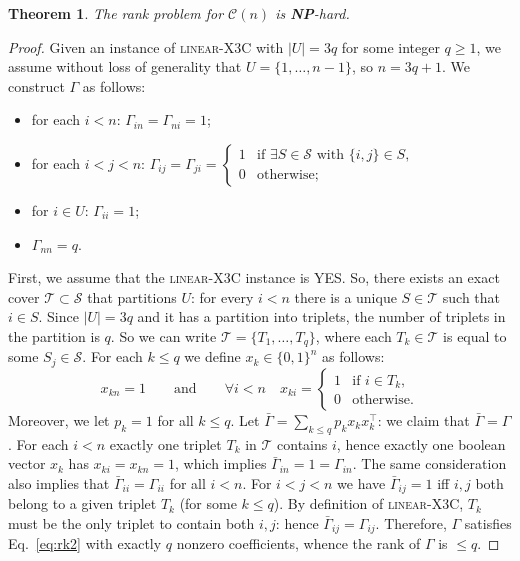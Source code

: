 \documentclass[10pt,a4paper]{amsart}
\newtheorem{theorem}{Theorem}
\newcommand{\CONX}[1]{\mathcal{C}(#1)}
\newcommand{\transpose}[1]{{#1}^{\top}}
\begin{document}
\begin{theorem}
  The rank problem for $\CONX{n}$ is \textbf{NP}-hard.
  \label{thm:rkhard}
\end{theorem}

\begin{proof}
  Given an instance of \textsc{linear}-X3C with $|U|=3q$ for some integer $q\ge 1$, we assume without loss of generality that $U=\{1,\ldots,n-1\}$, so $n=3q+1$. We construct $\Gamma$ as follows:
  \begin{itemize}
  \item for each $i<n$: $\Gamma_{in}=\Gamma_{ni} = 1$;
  \item for each $i<j<n$:
    $\Gamma_{ij} = \Gamma_{ji} = \left\{\begin{array}{ll} 1 & \mbox{if $\exists S\in\mathcal{S}$ with $\{i,j\}\in S$,} \\
      0 & \mbox{otherwise;}
    \end{array}\right.
    $
  \item for $i\in U$: $\Gamma_{ii} = 1$;
  \item $\Gamma_{nn}=q$.
  \end{itemize}
  
  First, we assume that the \textsc{linear}-X3C instance is YES. So, there exists an exact cover $\mathcal{T}\subset\mathcal{S}$ that partitions $U$: for every $i<n$ there is a unique $S\in\mathcal{T}$ such that $i\in S$. Since $|U|=3q$ and it has a partition into triplets, the number of triplets in the partition is $q$. So we can write $\mathcal{T}=\{T_1,\ldots,T_q\}$, where each $T_k\in\mathcal{T}$ is equal to some $S_j\in\mathcal{S}$. For each $k\le q$ we define $x_k\in\{0,1\}^n$ as follows:
  \[
  x_{kn}=1 \qquad \mbox{and} \qquad \forall i<n\quad x_{ki}=\left\{\begin{array}{ll} 1 & \mbox{if $i\in T_k$,} \\ 0 & \mbox{otherwise.}\end{array}\right.
  \]
  Moreover, we let $p_k=1$ for all $k\le q$. Let $\bar{\Gamma}=\sum_{k\le q} p_k x_k\transpose{x}_k$: we claim that $\bar{\Gamma}=\Gamma$. For each $i<n$ exactly one triplet $T_k$ in $\mathcal{T}$ contains $i$, hence exactly one boolean vector $x_k$ has $x_{ki}=x_{kn}=1$, which implies $\bar{\Gamma}_{in}=1=\Gamma_{in}$. The same consideration also implies that $\bar{\Gamma}_{ii}=\Gamma_{ii}$ for all $i<n$. For $i<j<n$ we have $\bar{\Gamma}_{ij}=1$ iff $i,j$ both belong to a given triplet $T_k$ (for some $k\le q$). By definition of \textsc{linear}-X3C, $T_k$ must be the only triplet to contain both $i,j$: hence $\bar{\Gamma}_{ij}=\Gamma_{ij}$. Therefore, $\Gamma$ satisfies Eq.~\eqref{eq:rk2} with exactly $q$ nonzero coefficients, whence the rank of $\Gamma$ is $\le q$.


\end{proof}
\end{document}
